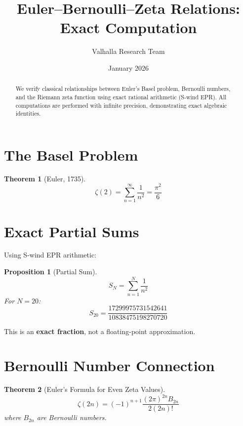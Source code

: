 \documentclass[11pt,a4paper]{article}
\title{Euler--Bernoulli--Zeta Relations: Exact Computation}
\author{Valhalla Research Team}
\date{January 2026}
\newtheorem{theorem}{Theorem}
\newtheorem{proposition}{Proposition}
\begin{document}
\maketitle

\begin{abstract}
We verify classical relationships between Euler's Basel problem, Bernoulli numbers, and the Riemann zeta function using exact rational arithmetic (S-wind EPR). All computations are performed with infinite precision, demonstrating exact algebraic identities.
\end{abstract}

\section{The Basel Problem}

\begin{theorem}[Euler, 1735]
\begin{equation}
\zeta(2) = \sum_{n=1}^{\infty} \frac{1}{n^2} = \frac{\pi^2}{6}
\end{equation}
\end{theorem}

\section{Exact Partial Sums}

Using S-wind EPR arithmetic:

\begin{proposition}[Partial Sum]
\begin{equation}
S_N = \sum_{n=1}^{N} \frac{1}{n^2}
\end{equation}
For $N = 20$:
\begin{equation}
S_{20} = \frac{17299975731542641}{10838475198270720}
\end{equation}
\end{proposition}

This is an \textbf{exact fraction}, not a floating-point approximation.

\section{Bernoulli Number Connection}

\begin{theorem}[Euler's Formula for Even Zeta Values]
\begin{equation}
\zeta(2n) = (-1)^{n+1} \frac{(2\pi)^{2n} B_{2n}}{2(2n)!}
\end{equation}
where $B_{2n}$ are Bernoulli numbers.
\end{theorem}
\end{document}
